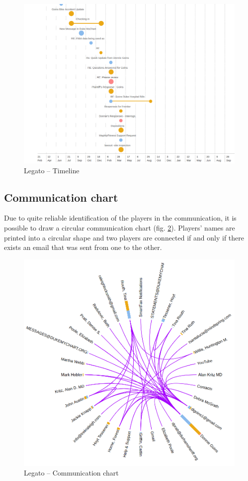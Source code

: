 \documentclass[
  digital, %
  notable,   %
  nolof,     %
  nolot,     %
  draft
]{fithesis3}
\begin{document}
\begin{figure}[h]
\caption{Legato -- Timeline}
\label{fig:legato_timeline}
\includegraphics[width=\textwidth]{img/Legato-Timeline}
\end{figure}

\subsection*{Communication chart}
Due to quite reliable identification of the players in the communication, it is possible to draw a circular communication chart (fig. \ref{fig:legato_communication}).
Players' names are printed into a circular shape and two players are connected if and only if there exists an email that was sent from one to the other.

\begin{figure}[h]
\caption{Legato -- Communication chart}
\label{fig:legato_communication}
\includegraphics[width=\textwidth]{img/Legato-Communication}
\end{figure}
\end{document}
